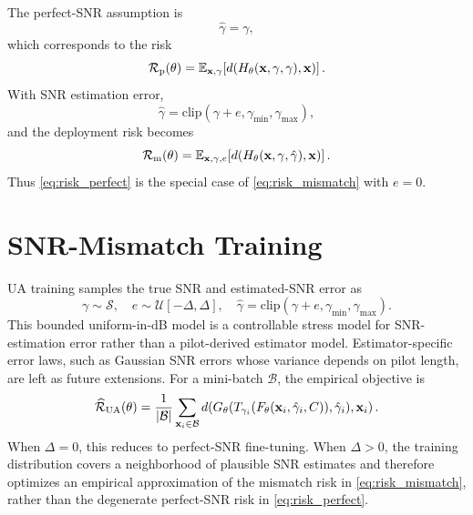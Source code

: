 \documentclass[10pt,journal]{IEEEtran}
\begin{document}
The perfect-SNR assumption is
\begin{equation}
\hat{\gamma}=\gamma,
\label{eq:perfect_snr}
\end{equation}
which corresponds to the risk
\begin{equation}
\mathcal{R}_{\rm p}(\theta)=
\mathbb{E}_{\mathbf{x},\gamma}
\!\left[
d\!\left(H_{\theta}(\mathbf{x},\gamma,\gamma),\mathbf{x}\right)
\right].
\label{eq:risk_perfect}
\end{equation}
With SNR estimation error,
\begin{equation}
\hat{\gamma}=\mathrm{clip}(\gamma+e,\gamma_{\min},\gamma_{\max}),
\label{eq:mismatch_model}
\end{equation}
and the deployment risk becomes
\begin{equation}
\mathcal{R}_{\rm m}(\theta)=
\mathbb{E}_{\mathbf{x},\gamma,e}
\!\left[
d\!\left(H_{\theta}(\mathbf{x},\gamma,\hat{\gamma}),\mathbf{x}\right)
\right].
\label{eq:risk_mismatch}
\end{equation}
Thus \eqref{eq:risk_perfect} is the special case of \eqref{eq:risk_mismatch} with $e=0$.



\section{SNR-Mismatch Training}

UA training samples the true SNR and estimated-SNR error as
\begin{equation}
\gamma\sim\mathcal{S},\quad
e\sim\mathcal{U}[-\Delta,\Delta],\quad
\hat{\gamma}=\mathrm{clip}(\gamma+e,\gamma_{\min},\gamma_{\max}).
\label{eq:ua_sampling}
\end{equation}
This bounded uniform-in-dB model is a controllable stress model for SNR-estimation error rather than a pilot-derived estimator model. Estimator-specific error laws, such as Gaussian SNR errors whose variance depends on pilot length, are left as future extensions.
For a mini-batch $\mathcal{B}$, the empirical objective is
\begin{equation}
\widehat{\mathcal{R}}_{\rm UA}(\theta)=
\frac{1}{|\mathcal{B}|}
\sum_{\mathbf{x}_i\in\mathcal{B}}
d\!\left(G_{\theta}(T_{\gamma_i}(F_{\theta}(\mathbf{x}_i,\hat{\gamma}_i,C)),\hat{\gamma}_i),\mathbf{x}_i\right).
\label{eq:ua_risk}
\end{equation}
When $\Delta=0$, this reduces to perfect-SNR fine-tuning. When $\Delta>0$, the training distribution covers a neighborhood of plausible SNR estimates and therefore optimizes an empirical approximation of the mismatch risk in \eqref{eq:risk_mismatch}, rather than the degenerate perfect-SNR risk in \eqref{eq:risk_perfect}.
\end{document}
